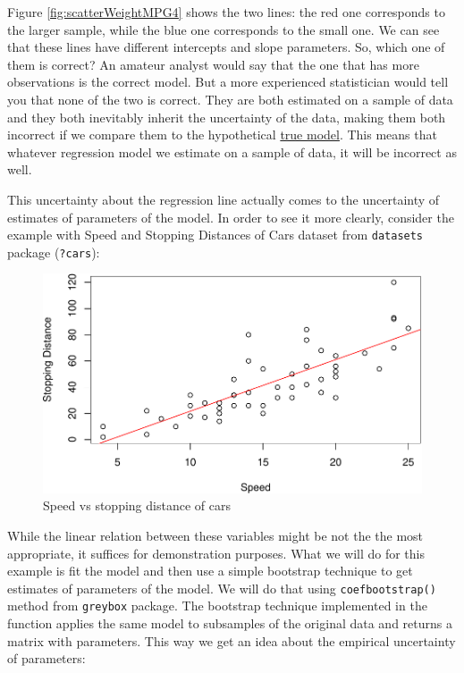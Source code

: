 \documentclass[
]{book}
\theoremstyle{definition}
\theoremstyle{definition}
\theoremstyle{definition}
\theoremstyle{definition}
\theoremstyle{remark}
\begin{document}
Figure \ref{fig:scatterWeightMPG4} shows the two lines: the red one corresponds to the larger sample, while the blue one corresponds to the small one. We can see that these lines have different intercepts and slope parameters. So, which one of them is correct? An amateur analyst would say that the one that has more observations is the correct model. But a more experienced statistician would tell you that none of the two is correct. They are both estimated on a sample of data and they both inevitably inherit the uncertainty of the data, making them both incorrect if we compare them to the hypothetical \protect\hyperlink{modelsMethods}{true model}. This means that whatever regression model we estimate on a sample of data, it will be incorrect as well.

This uncertainty about the regression line actually comes to the uncertainty of estimates of parameters of the model. In order to see it more clearly, consider the example with Speed and Stopping Distances of Cars dataset from \texttt{datasets} package (\texttt{?cars}):

\begin{figure}
\centering
\includegraphics{Svetunkov---Statistics-for-Business-Analytics_files/figure-latex/scatterSpeedDistance-1.pdf}
\caption{\label{fig:scatterSpeedDistance}Speed vs stopping distance of cars}
\end{figure}

While the linear relation between these variables might be not the the most appropriate, it suffices for demonstration purposes. What we will do for this example is fit the model and then use a simple bootstrap technique to get estimates of parameters of the model. We will do that using \texttt{coefbootstrap()} method from \texttt{greybox} package. The bootstrap technique implemented in the function applies the same model to subsamples of the original data and returns a matrix with parameters. This way we get an idea about the empirical uncertainty of parameters:
\end{document}
